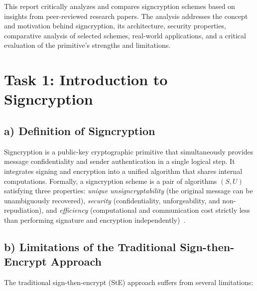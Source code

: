\documentclass[11pt,a4paper]{article}
\begin{document}
This report critically analyzes and compares signcryption schemes based on insights from peer-reviewed research papers. The analysis addresses the concept and motivation behind signcryption, its architecture, security properties, comparative analysis of selected schemes, real-world applications, and a critical evaluation of the primitive's strengths and limitations.

\section{Task 1: Introduction to Signcryption}

\subsection{a) Definition of Signcryption}

Signcryption is a public-key cryptographic primitive that simultaneously provides message confidentiality and sender authentication in a single logical step. It integrates signing and encryption into a unified algorithm that shares internal computations. Formally, a signcryption scheme is a pair of algorithms $(S, U)$ satisfying three properties: \textit{unique unsigncryptability} (the original message can be unambiguously recovered), \textit{security} (confidentiality, unforgeability, and non-repudiation), and \textit{efficiency} (computational and communication cost strictly less than performing signature and encryption independently)~\cite{zheng1997}.

\subsection{b) Limitations of the Traditional Sign-then-Encrypt Approach}

The traditional sign-then-encrypt (StE) approach suffers from several limitations:
\end{document}

